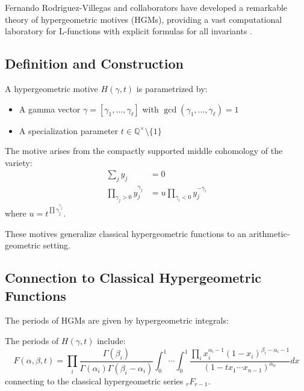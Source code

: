 Fernando Rodriguez-Villegas and collaborators have developed a remarkable theory of hypergeometric motives (HGMs), providing a vast computational laboratory for L-functions with explicit formulas for all invariants \cite{rodriguez2018, roberts2021}.

\subsection{Definition and Construction}

\begin{definition}
\label{def:hgm}
A hypergeometric motive $H(\gamma, t)$ is parametrized by:
\begin{itemize}
\item A gamma vector $\gamma = [\gamma_1, \ldots, \gamma_\ell]$ with $\gcd(\gamma_1, \ldots, \gamma_\ell) = 1$
\item A specialization parameter $t \in \mathbb{Q}^\times \setminus \{1\}$
\end{itemize}
The motive arises from the compactly supported middle cohomology of the variety:
\begin{align}
\sum_{j} y_j &= 0 \\
\prod_{\gamma_j > 0} y_j^{\gamma_j} &= u \prod_{\gamma_i < 0} y_j^{-\gamma_i}
\end{align}
where $u = t^{\prod \gamma_j^{\gamma_j}}$.
\end{definition}

These motives generalize classical hypergeometric functions to an arithmetic-geometric setting.

\subsection{Connection to Classical Hypergeometric Functions}

The periods of HGMs are given by hypergeometric integrals:

\begin{theorem}
\label{thm:hgm_periods}
The periods of $H(\gamma, t)$ include:
\begin{equation}
F(\alpha, \beta, t) = \prod_i \frac{\Gamma(\beta_i)}{\Gamma(\alpha_i)\Gamma(\beta_i - \alpha_i)} \int_0^1 \cdots \int_0^1 \frac{\prod_i x_i^{\alpha_i-1}(1-x_i)^{\beta_i-\alpha_i-1}}{(1-tx_1 \cdots x_{n-1})^{\alpha_n}} dx
\end{equation}
connecting to the classical hypergeometric series $_rF_{r-1}$.
\end{theorem}

